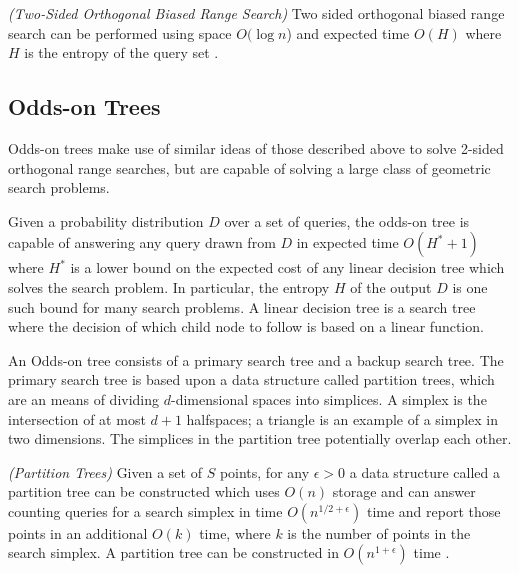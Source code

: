 \documentclass[mcs]{scsthesis}
\begin{document}

\begin{thm} \emph{(Two-Sided Orthogonal Biased Range Search)} 
Two sided orthogonal biased range search can be performed using space
\(O(\log n\)) and expected time \(O(H)\) where \(H\) is the entropy of the query
set \cite{biasedrange}.
\end{thm}


\subsection{Odds-on Trees}

Odds-on trees make use of similar ideas of those described above to solve
2-sided orthogonal range searches, but are capable of solving a large class
of geometric search problems.

Given a probability distribution \(D\) over a set of queries, the odds-on tree
is capable of answering any query drawn from \(D\) in expected time
\(O(H^* + 1)\) where \(H^*\) is a lower bound on the expected cost of any
linear decision tree which solves the search problem. In particular, the
entropy \(H\) of the output \(D\) is one such bound for many search
problems. A linear decision tree is a search tree where the decision of which
child node to follow is based on a linear function.

An Odds-on tree consists of a primary search tree and a backup search tree.
The primary search tree is based upon a data structure called partition trees,
which are an means of dividing \(d\)-dimensional spaces into simplices. A
simplex is the intersection of at most \(d + 1\) halfspaces; a triangle is an
example of a simplex in two dimensions. The simplices in the partition tree
potentially overlap each other.

\begin{thm} \emph{(Partition Trees)} 
Given a set of \(S\) points, for any \(\epsilon > 0\) a data structure called
a partition tree can be constructed which uses \(O(n)\) storage and can answer
counting queries for a search simplex in time \(O(n^{1/2 + \epsilon})\) time and
report those points in an additional \(O(k)\) time, where \(k\) is the number
of points in the search simplex. A partition tree can be constructed in
\(O(n^{1 + \epsilon})\) time \cite{dutch}.
\end{thm}
\end{document}
